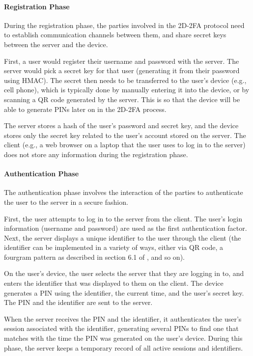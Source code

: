 \documentclass[11pt]{article} %
\begin{document}
\paragraph{Registration Phase}
During the registration phase, the parties involved in the 2D-2FA
protocol need to establish communication channels between them, and
share secret keys between the server and the device. 

First, a user would register their username and password with the
server. The server would pick a secret key for that user (generating it
from their password using HMAC). The secret then needs to be transferred
to the user's device (e.g., cell phone), which is typically done by
manually entering it into the device, or by scanning a QR code generated
by the server. This is so that the device will be able to generate PINs
later on in the 2D-2FA process. 

The server stores a hash of the user's password and secret key, and the
device stores only the secret key related to the user's account stored
on the server. The client (e.g., a web browser on a laptop that the user
uses to log in to the server) does not store any information during the
registration phase. 

\paragraph{Authentication Phase}
The authentication phase involves the interaction of the parties to
authenticate the user to the server in a secure fashion. 

First, the user attempts to log in to the server from the client. The
user's login information (username and password) are used as the first
authentication factor. Next, the server displays a unique identifier to
the user through the client (the identifier can be implemented in a
variety of ways, either via QR code, a fourgram pattern as described in
section 6.1 of \cite{shirvanian2d2fa}, and so on). 

On the user's device, the user selects the server that they are logging
in to, and enters the identifier that was displayed to them on the
client. The device generates a PIN using the identifier, the current
time, and the user's secret key. The PIN and the identifier are sent to
the server.

When the server receives the PIN and the identifier, it authenticates
the user's session associated with the identifier, generating several
PINs to find one that matches with the time the PIN was generated on the
user's device. During this phase, the server keeps a temporary record of
all active sessions and identifiers.
\end{document}
